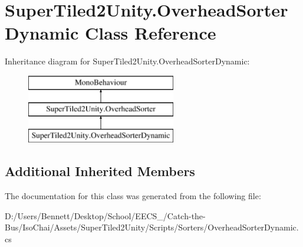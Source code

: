 \hypertarget{class_super_tiled2_unity_1_1_overhead_sorter_dynamic}{}\section{Super\+Tiled2\+Unity.\+Overhead\+Sorter\+Dynamic Class Reference}
\label{class_super_tiled2_unity_1_1_overhead_sorter_dynamic}
Inheritance diagram for Super\+Tiled2\+Unity.\+Overhead\+Sorter\+Dynamic\+:\begin{figure}[H]
\begin{center}
\leavevmode
\includegraphics[height=3.000000cm]{class_super_tiled2_unity_1_1_overhead_sorter_dynamic}
\end{center}
\end{figure}
\subsection*{Additional Inherited Members}


The documentation for this class was generated from the following file\+:\begin{DoxyCompactItemize}
\item 
D\+:/\+Users/\+Bennett/\+Desktop/\+School/\+E\+E\+C\+S\+\_/\+Catch-\/the-\/\+Bus/\+Iso\+Chai/\+Assets/\+Super\+Tiled2\+Unity/\+Scripts/\+Sorters/Overhead\+Sorter\+Dynamic.\+cs\end{DoxyCompactItemize}
